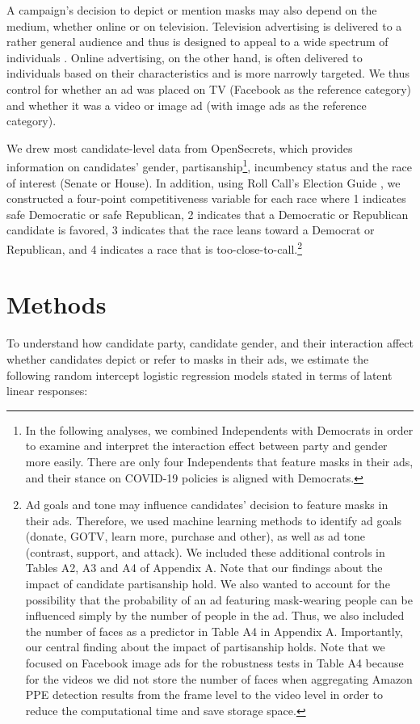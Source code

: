 A campaign's decision to depict or mention masks may also depend on the medium, whether online or on television. Television advertising is delivered to a rather general audience and thus is designed to appeal to a wide spectrum of individuals \parencite{fowler2021political}.  Online advertising, on the other hand, is often delivered to individuals based on their characteristics and is more narrowly targeted.  We thus control for whether an ad was placed on TV (Facebook as the reference category) and whether it was a video or image ad (with image ads as the reference category).

We drew most candidate-level data from OpenSecrets, which provides information on candidates' gender, partisanship\footnote{In the following analyses, we combined Independents with Democrats in order to examine and interpret the interaction effect between party and gender more easily. There are only four Independents that feature masks in their ads, and their stance on COVID-19 policies is aligned with Democrats.}, incumbency status and the race of interest (Senate or House).  In addition, using Roll Call's Election Guide \parencite{rollcall2020}, we constructed a four-point competitiveness variable for each race where 1 indicates safe Democratic or safe Republican, 2 indicates that a Democratic or Republican candidate is favored, 3 indicates that the race leans toward a Democrat or Republican, and 4 indicates a race that is too-close-to-call.\footnote{Ad goals and tone may influence candidates' decision to feature masks in their ads. Therefore, we used machine learning methods to identify ad goals (donate, GOTV, learn more, purchase and other), as well as ad tone (contrast, support, and attack). We included these additional controls in Tables A2, A3 and A4 of Appendix A. Note that our findings about the impact of candidate partisanship hold. We also wanted to account for the possibility that the probability of an ad featuring mask-wearing people can be influenced simply by the number of people in the ad.  Thus, we also included the number of faces as a predictor in Table A4 in Appendix A. Importantly, our central finding about the impact of partisanship holds. Note that we focused on Facebook image ads for the robustness tests in Table A4 because for the videos we did not store the number of faces when aggregating Amazon PPE detection results from the frame level to the video level in order to reduce the computational time and save storage space.}

\section*{Methods}
To understand how candidate party, candidate gender, and their interaction affect whether candidates depict or refer to masks in their ads, we estimate the following random intercept logistic regression models stated in terms of latent linear responses:

